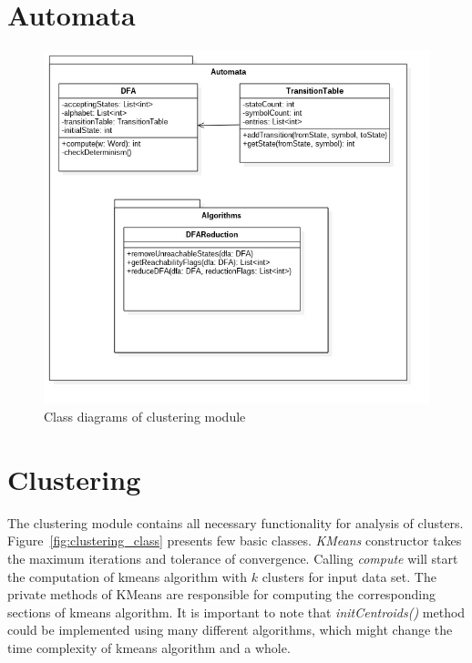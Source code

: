 \documentclass{mini}
\begin{document}
\section{Automata}
\begin{figure}[H]
    \centering
    \includegraphics[width=1.0\textwidth]{../uml/classes/automata.jpg}
    \caption{Class diagrams of clustering module}
    \label{fig:automata_class}
\end{figure}


\section{Clustering}

The clustering module contains all necessary functionality for analysis of clusters. Figure~\ref{fig:clustering_class} presents few basic classes. \textit{KMeans} constructor takes the maximum iterations and tolerance of convergence. Calling \textit{compute} will start the computation of kmeans algorithm with $k$ clusters for input data set. The private methods of KMeans are responsible for computing the corresponding sections of kmeans algorithm. It is important to note that \textit{initCentroids()} method could be implemented using many different algorithms, which might change the time complexity of kmeans algorithm and a whole.
\end{document}
